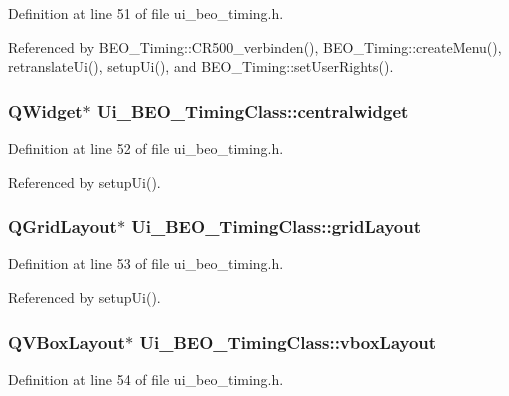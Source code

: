 Definition at line 51 of file ui\_\-beo\_\-timing.h.

Referenced by BEO\_\-Timing::CR500\_\-verbinden(), BEO\_\-Timing::createMenu(), retranslateUi(), setupUi(), and BEO\_\-Timing::setUserRights().\hypertarget{class_ui___b_e_o___timing_class_2e65534458d73079bc2d217bfd4fc903}{
\subsubsection[centralwidget]{\setlength{\rightskip}{0pt plus 5cm}QWidget$\ast$ {\bf Ui\_\-BEO\_\-TimingClass::centralwidget}}}
\label{class_ui___b_e_o___timing_class_2e65534458d73079bc2d217bfd4fc903}




Definition at line 52 of file ui\_\-beo\_\-timing.h.

Referenced by setupUi().\hypertarget{class_ui___b_e_o___timing_class_8589036be2703c8cb2aaac195c8ee083}{
\subsubsection[gridLayout]{\setlength{\rightskip}{0pt plus 5cm}QGridLayout$\ast$ {\bf Ui\_\-BEO\_\-TimingClass::gridLayout}}}
\label{class_ui___b_e_o___timing_class_8589036be2703c8cb2aaac195c8ee083}




Definition at line 53 of file ui\_\-beo\_\-timing.h.

Referenced by setupUi().\hypertarget{class_ui___b_e_o___timing_class_ff8f87706aad892dd2d20ed4f7b4c7fe}{
\subsubsection[vboxLayout]{\setlength{\rightskip}{0pt plus 5cm}QVBoxLayout$\ast$ {\bf Ui\_\-BEO\_\-TimingClass::vboxLayout}}}
\label{class_ui___b_e_o___timing_class_ff8f87706aad892dd2d20ed4f7b4c7fe}




Definition at line 54 of file ui\_\-beo\_\-timing.h.

